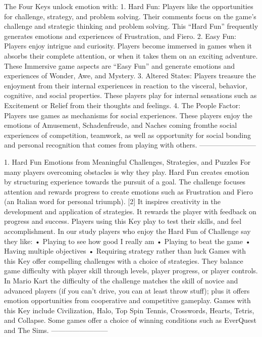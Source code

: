 The Four Keys unlock emotion with:
1. Hard Fun: Players like the opportunities for challenge, strategy, and problem
solving. Their comments focus on the game’s challenge and strategic thinking and
problem solving. This “Hard Fun” frequently generates emotions and experiences of
Frustration, and Fiero.
2. Easy Fun: Players enjoy intrigue and curiosity. Players become immersed in games
when it absorbs their complete attention, or when it takes them on an exciting
adventure. These Immersive game aspects are “Easy Fun” and generate emotions
and experiences of Wonder, Awe, and Mystery.
3. Altered States: Players treasure the enjoyment from their internal experiences in
reaction to the visceral, behavior, cognitive, and social properties. These players
play for internal sensations such as Excitement or Relief from their thoughts and
feelings.
4. The People Factor: Players use games as mechanisms for social experiences.
These players enjoy the emotions of Amusement, Schadenfreude, and Naches
coming fromthe social experiences of competition, teamwork, as well as opportunity
for social bonding and personal recognition that comes from playing with others.
------------------------

1. Hard Fun
Emotions from Meaningful Challenges, Strategies, and Puzzles
For many players overcoming obstacles is why they play. Hard Fun creates emotion by
structuring experience towards the pursuit of a goal. The challenge focuses attention and
rewards progress to create emotions such as Frustration and Fiero (an Italian word for
personal triumph). [2] It inspires creativity in the development and application of strategies. It
rewards the player with feedback on progress and success. Players using this Key play to test
their skills, and feel accomplishment. In our study players who enjoy the Hard Fun of
Challenge say they like:
• Playing to see how good I really am
• Playing to beat the game
• Having multiple objectives
• Requiring strategy rather than luck
Games with this Key offer compelling challenges with a choice of strategies. They balance
game difficulty with player skill through levels, player progress, or player controls. In Mario Kart
the difficulty of the challenge matches the skill of novice and advanced players (if you can’t
drive, you can at least throw stuff); plus it offers emotion opportunities from cooperative and
competitive gameplay. Games with this Key include Civilization, Halo, Top Spin Tennis,
Crosswords, Hearts, Tetris, and Collapse. Some games offer a choice of winning conditions
such as EverQuest and The Sims.
------------------------
